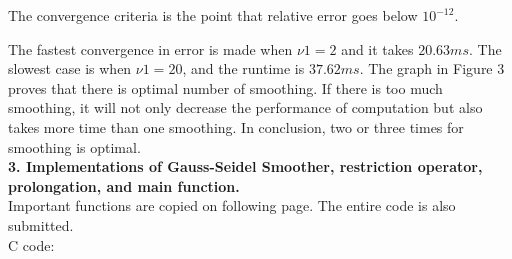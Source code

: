 \documentclass[12pt]{article}
\begin{document}
The convergence criteria is the point that relative error goes below $10^{-12}$. 

The fastest convergence in error is made when $\nu1=2$ and it takes $20.63ms$. The slowest case is when $\nu1=20$, and the runtime is $37.62ms$. The graph in Figure 3 proves that there is optimal number of smoothing. If there is too much smoothing, it will not only decrease the performance of computation but also takes more time than one smoothing. In conclusion, two or three times for smoothing is optimal. 
\\

\textbf{3. Implementations of Gauss-Seidel Smoother, restriction operator, prolongation, and main function.}
\\
Important functions are copied on following page. The entire code is also submitted.
\\

C code:

\end{document}
